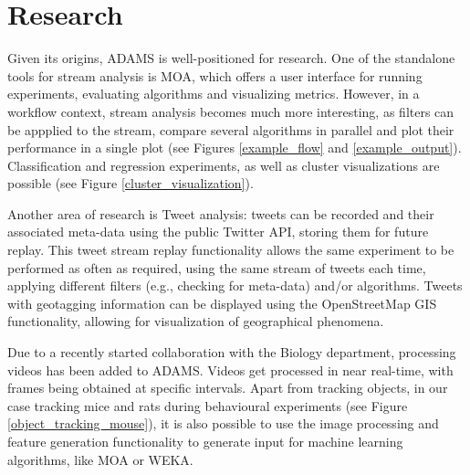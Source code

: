 \documentclass[wcp]{jmlr}
\begin{document}
\section{Research}
Given its origins, ADAMS is well-positioned for research. One of the standalone tools for stream analysis is MOA, which offers a user interface for running experiments, evaluating algorithms and visualizing metrics. However, in a workflow context, stream analysis becomes much more interesting, as filters can be appplied to the stream, compare several algorithms in parallel and plot their performance in a single plot (see Figures \ref{example_flow} and \ref{example_output}). Classification and regression experiments, as well as cluster visualizations are possible (see Figure \ref{cluster_visualization}).

Another area of research is Tweet analysis: tweets can be recorded and their associated meta-data using the public Twitter API, storing them for future replay. This tweet stream replay functionality allows the same experiment to be performed as often as required, using the same stream of tweets each time, applying different filters (e.g., checking for meta-data) and/or algorithms. Tweets with geotagging information can be displayed using the OpenStreetMap GIS functionality, allowing for visualization of geographical phenomena.

Due to a recently started collaboration with the Biology department, processing videos has been added to ADAMS. Videos get processed in near real-time, with frames being obtained at specific intervals. Apart from tracking objects, in our case tracking mice and rats during behavioural experiments (see Figure \ref{object_tracking_mouse}), it is also possible to use the image processing and feature generation functionality to generate input for machine learning algorithms, like MOA or WEKA.
\end{document}
